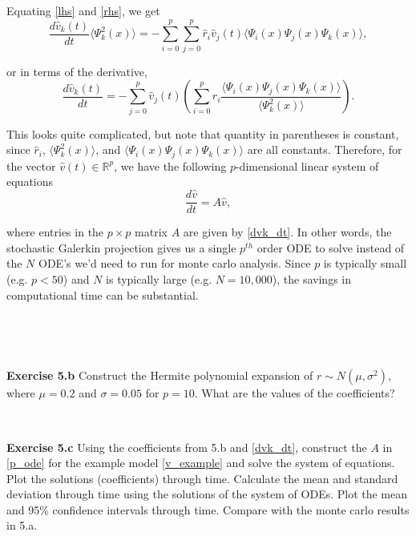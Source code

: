 \documentclass[11pt]{article}
\numberwithin{equation}{section}
\begin{document}
Equating \eqref{lhs} and \eqref{rhs}, we get 
\begin{equation*}
\frac{d\hat{v}_k(t)}{dt} \langle \Psi_k^2(x) \rangle = - \sum_{i=0}^p \sum_{j=0}^p \hat{r}_i \hat{v}_j(t) \langle \Psi_i(x) \Psi_j(x) \Psi_k(x) \rangle,
\end{equation*}

or in terms of the derivative,
\begin{equation}
\frac{d\hat{v}_k(t)}{dt} = - \sum_{j=0}^p \hat{v}_j(t) \left( \sum_{i=0}^p \hat{r}_i \frac{\langle \Psi_i(x) \Psi_j(x) \Psi_k(x) \rangle}{\langle \Psi_k^2(x) \rangle } \right). \label{dvk_dt}
\end{equation}

This looks quite complicated, but note that quantity in parentheses is constant, since $\hat{r}_i$, $\langle \Psi_k^2(x) \rangle$, and $\langle \Psi_i(x) \Psi_j(x) \Psi_k(x) \rangle$ are all constants. Therefore, for the vector $\hat{v}(t) \in \mathbb{R}^p$, we have the following $p$-dimensional linear system of equations
\begin{equation}
\frac{d \hat{v}}{dt} = A \hat{v}, \label{p_ode}
\end{equation}

where entries in the $p \times p$ matrix $A$ are given by \eqref{dvk_dt}. In other words, the stochastic Galerkin projection gives us a single $p^{th}$ order ODE to solve instead of the $N$ ODE's we'd need to run for monte carlo analysis. Since $p$ is typically small (e.g. $p < 50$) and $N$ is typically large (e.g. $N = 10,000$), the savings in computational time can be substantial.





\

\

\textbf{Exercise 5.b} Construct the Hermite polynomial expansion of $r \sim N(\mu, \sigma^2)$, where $\mu = 0.2$ and $\sigma = 0.05$ for $p = 10$. What are the values of the coefficients?

\

\textbf{Exercise 5.c} Using the coefficients from 5.b and \eqref{dvk_dt}, construct the $A$ in \eqref{p_ode} for the example model \eqref{v_example} and solve the system of equations. Plot the solutions (coefficients) through time. Calculate the mean and standard deviation through time using the solutions of the system of ODEs. Plot the mean and 95\% confidence intervals through time. Compare with the monte carlo results in 5.a.

\
\end{document}
